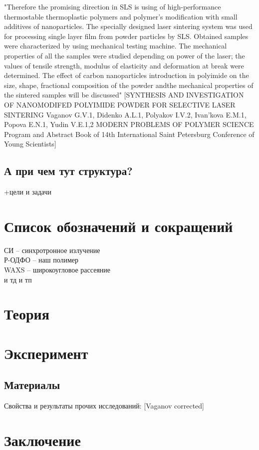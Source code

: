 \documentclass[oneside,final,14pt]{extreport}
\begin{document}
	"Therefore the promising direction in SLS is using of high-performance thermostable
thermoplastic polymers and polymer’s modification with small additives of nanoparticles.
The specially designed laser sintering system was used for processing single layer film from powder particles by SLS. Obtained
samples were characterized by using mechanical testing machine.
The mechanical properties of all the samples were studied depending on power of the laser; the values of tensile strength, modulus of
elasticity and deformation at break were determined. The effect of carbon nanoparticles introduction in polyimide on the size, shape,
fractional composition of the powder andthe mechanical properties of the sintered samples will be discussed"
[SYNTHESIS AND INVESTIGATION OF NANOMODIFED POLYIMIDE POWDER FOR
SELECTIVE LASER SINTERING
Vaganov G.V.1, Didenko A.L.1, Polyakov I.V.2, Ivan’kova E.M.1, Popova E.N.1, Yudin V.E.1,2 MODERN PROBLEMS
OF POLYMER SCIENCE
Program and Abstract Book
of 14th International Saint Petersburg Conference
of Young Scientists]	

\section{А при чем тут структура?}
+цели и задачи


	
	\chapter*{Список обозначений и сокращений}
	
	СИ -- синхротронное излучение\\
	Р-ОДФО -- наш полимер\\
	WAXS -- широкоугловое рассеяние\\
	и тд и тп
	
	\chapter{Теория}
	
	
	
	\chapter{Эксперимент}
	
	\section{Материалы}
	
	Свойства и результаты прочих исследований:
	[Vaganov corrected]
	
	
	
	\chapter*{Заключение}
	
	
	
\end{document}
